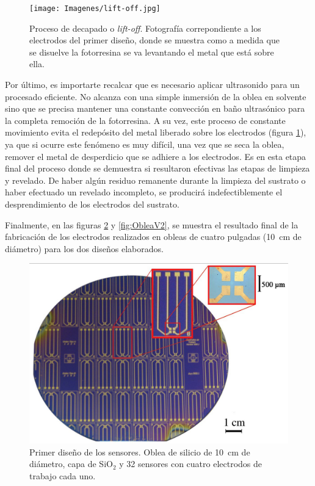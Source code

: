 					  \begin{figure}[ht!]
					  \begin{center}
					  \texttt{[image: Imagenes/lift-off.jpg]}
					  \caption[Proceso de decapado o\textit{ lift-off}]{Proceso de decapado o\textit{ lift-off}. Fotografía correpondiente a los electrodos del primer diseño, donde se muestra como a medida que se disuelve la fotorresina se va levantando el metal que está sobre ella.}
					  \label{fig:ultrasonido}
					  \end{center}
					  \end{figure}

		 Por último, es importarte recalcar que es necesario aplicar ultrasonido para un procesado eficiente. No alcanza con una simple inmersión de la oblea en solvente sino que se precisa mantener una constante convección en baño ultrasónico para la completa remoción de la fotorresina. A su vez, este proceso de constante movimiento evita el redepósito del metal liberado sobre los electrodos (figura \ref{fig:ultrasonido}), ya que si ocurre este fenómeno es muy difícil, una vez que se seca la oblea, remover el metal de desperdicio que se adhiere a los electrodos. Es en esta etapa final del proceso donde se demuestra si resultaron efectivas las etapas de limpieza y revelado. De haber algún residuo remanente durante la limpieza del sustrato o haber efectuado un revelado incompleto, se producirá indefectiblemente el desprendimiento de los electrodos del sustrato.

		 Finalmente, en las figuras \ref{fig:ObleaV1} y \ref{fig:ObleaV2}, se muestra el resultado final de la fabricación de los electrodos realizados en obleas de cuatro pulgadas (\SI{10}{\cm} de diámetro) para los dos diseños elaborados.

		 			  \clearpage
					  \begin{figure}[ht!]
					  \begin{center}
					  \includegraphics[width=\textwidth]{Imagenes/ObleaV1.jpg}
					  \caption[Electrodos, primera versión]{Primer diseño de los sensores. Oblea de silicio de \SI{10}{cm} de diámetro, capa de SiO$_2$ y 32 sensores con cuatro electrodos de trabajo cada uno.}
					  \label{fig:ObleaV1}
					  \end{center}
					  \end{figure} 	

